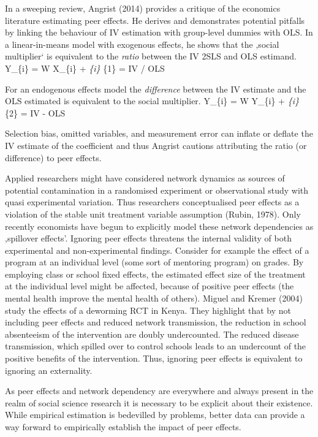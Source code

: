 \documentclass[
  a4paper,
]{article}
\begin{document}
In a sweeping review, Angrist (2014) provides a critique of the
economics literature estimating peer effects. He derives and
demonstrates potential pitfalls by linking the behaviour of IV
estimation with group-level dummies with OLS. In a linear-in-means model
with exogenous effects, he shows that the ‚social multiplier` is
equivalent to the \emph{ratio} between the IV 2SLS and OLS estimand.
Y\_\{i\} = W X\_\{i\} \beta + \varespilon\emph{\{i\} \phi}\{1\} = IV /
OLS

For an endogenous effects model the \emph{difference} between the IV
estimate and the OLS estimated is equivalent to the social multiplier.
Y\_\{i\} = W Y\_\{i\} \delta + \varespilon\emph{\{i\} \phi}\{2\} = IV -
OLS

Selection bias, omitted variables, and measurement error can inflate or
deflate the IV estimate of the coefficient and thus Angrist cautions
attributing the ratio (or difference) to peer effects.

Applied researchers might have considered network dynamics as sources of
potential contamination in a randomised experiment or observational
study with quasi experimental variation. Thus researchers conceptualised
peer effects as a violation of the stable unit treatment variable
assumption (Rubin, 1978). Only recently economists have begun to
explicitly model these network dependencies as ‚spillover effects'.
Ignoring peer effects threatens the internal validity of both
experimental and non-experimental findings. Consider for example the
effect of a program at an individual level (some sort of mentoring
program) on grades. By employing class or school fixed effects, the
estimated effect size of the treatment at the individual level might be
affected, because of positive peer effects (the mental health improve
the mental health of others). Miguel and Kremer (2004) study the effects
of a deworming RCT in Kenya. They highlight that by not including peer
effects and reduced network transmission, the reduction in school
absenteeism of the intervention are doubly undercounted. The reduced
disease transmission, which spilled over to control schools leads to an
undercount of the positive benefits of the intervention. Thus, ignoring
peer effects is equivalent to ignoring an externality.

As peer effects and network dependency are everywhere and always present
in the realm of social science research it is necessary to be explicit
about their existence. While empirical estimation is bedevilled by
problems, better data can provide a way forward to empirically establish
the impact of peer effects.
\end{document}
